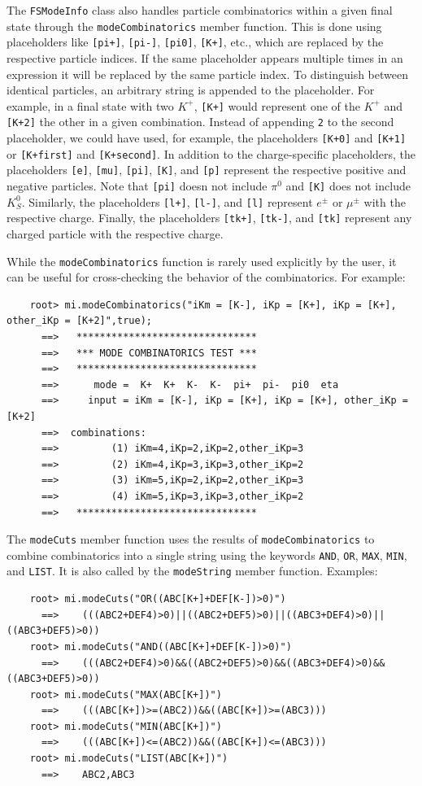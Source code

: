 \documentclass[11pt]{article}
\begin{document}
The {\tt FSModeInfo} class also handles particle combinatorics within a given final state through the {\tt modeCombinatorics} member function.  This is done using placeholders like {\tt [pi+]}, {\tt [pi-]}, {\tt [pi0]}, {\tt [K+]}, etc., which are replaced by the respective particle indices.  If the same placeholder appears multiple times in an expression it will be replaced by the same particle index.  To distinguish between identical particles, an arbitrary string is appended to the placeholder.  For example, in a final state with two $K^+$, {\tt [K+]} would represent one of the $K^+$ and {\tt [K+2]} the other in a given combination.  Instead of appending {\tt 2} to the second placeholder, we could have used, for example, the placeholders {\tt [K+0]} and {\tt [K+1]} or {\tt [K+first]} and {\tt [K+second]}.  In addition to the charge-specific placeholders, the placeholders {\tt [e]}, {\tt [mu]}, {\tt [pi]}, {\tt [K]}, and {\tt [p]} represent the respective positive and negative particles.  Note that {\tt [pi]} doesn not include $\pi^0$ and {\tt [K]} does not include $K^0_S$.  Similarly, the placeholders {\tt [l+]}, {\tt [l-]}, and {\tt [l]} represent $e^\pm$ or $\mu^\pm$ with the respective charge.  Finally, the placeholders {\tt [tk+]}, {\tt [tk-]}, and {\tt [tk]} represent any charged particle with the respective charge.

While the {\tt modeCombinatorics} function is rarely used explicitly by the user, it can be useful for cross-checking the behavior of the combinatorics. For example:
\begin{verbatim}
    root> mi.modeCombinatorics("iKm = [K-], iKp = [K+], iKp = [K+], other_iKp = [K+2]",true);
      ==>   *******************************
      ==>   *** MODE COMBINATORICS TEST ***
      ==>   *******************************
      ==>      mode =  K+  K+  K-  K-  pi+  pi-  pi0  eta
      ==>     input = iKm = [K-], iKp = [K+], iKp = [K+], other_iKp = [K+2]
      ==>  combinations:
      ==>         (1) iKm=4,iKp=2,iKp=2,other_iKp=3
      ==>         (2) iKm=4,iKp=3,iKp=3,other_iKp=2
      ==>         (3) iKm=5,iKp=2,iKp=2,other_iKp=3
      ==>         (4) iKm=5,iKp=3,iKp=3,other_iKp=2
      ==>   *******************************
\end{verbatim}

The {\tt modeCuts} member function uses the results of {\tt modeCombinatorics} to combine combinatorics into a single string using the keywords {\tt AND}, {\tt OR}, {\tt MAX}, {\tt MIN}, and {\tt LIST}.  It is also called by the {\tt modeString} member function.  Examples:
\begin{verbatim}
    root> mi.modeCuts("OR((ABC[K+]+DEF[K-])>0)")
      ==>    (((ABC2+DEF4)>0)||((ABC2+DEF5)>0)||((ABC3+DEF4)>0)||((ABC3+DEF5)>0))
    root> mi.modeCuts("AND((ABC[K+]+DEF[K-])>0)")
      ==>    (((ABC2+DEF4)>0)&&((ABC2+DEF5)>0)&&((ABC3+DEF4)>0)&&((ABC3+DEF5)>0))
    root> mi.modeCuts("MAX(ABC[K+])")
      ==>    (((ABC[K+])>=(ABC2))&&((ABC[K+])>=(ABC3)))
    root> mi.modeCuts("MIN(ABC[K+])")
      ==>    (((ABC[K+])<=(ABC2))&&((ABC[K+])<=(ABC3)))
    root> mi.modeCuts("LIST(ABC[K+])")
      ==>    ABC2,ABC3
\end{verbatim}
\end{document}
